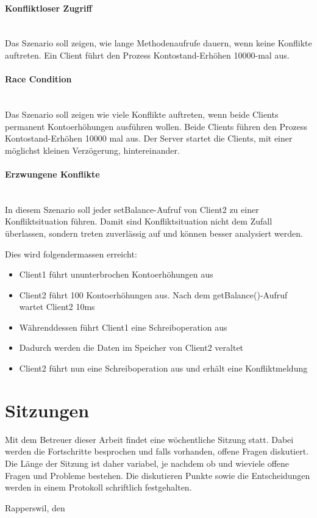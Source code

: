 \documentclass{article}
\begin{document}
\paragraph{Konfliktloser Zugriff}
\label{sec:konfl-zugr}
$~~$ \\
Das Szenario soll zeigen, wie lange Methodenaufrufe dauern, wenn keine Konflikte auftreten. Ein Client führt den Prozess Kontostand-Erhöhen 10000-mal aus.

\paragraph{Race Condition}
\label{sec:race-condition}
$~~$ \\
Das Szenario soll zeigen wie viele Konflikte auftreten, wenn beide Clients permanent Kontoerhöhungen ausführen wollen.
Beide Clients führen den Prozess Kontostand-Erhöhen 10000 mal aus. Der Server startet die Clients, mit einer möglichst kleinen Verzögerung, hintereinander. 

\paragraph{Erzwungene Konflikte}
\label{sec:erzwungene-konflikte}
$~~$ \\
In diesem Szenario soll jeder setBalance-Aufruf von Client2 zu einer Konfliktsituation führen. Damit sind Konfliktsituation nicht dem Zufall überlassen, sondern treten zuverlässig auf und können besser analysiert werden.

\noindent Dies wird folgendermassen erreicht:
\begin{itemize}
\item Client1 führt ununterbrochen Kontoerhöhungen aus
\item Client2 führt 100 Kontoerhöhungen aus. Nach dem getBalance()-Aufruf wartet Client2 10ms
\item Währenddessen führt Client1 eine Schreiboperation aus
\item Dadurch werden die Daten im Speicher von Client2 veraltet
\item Client2 führt nun eine Schreiboperation aus und erhält eine Konfliktmeldung
\end{itemize}

\section{Sitzungen}
Mit dem Betreuer dieser Arbeit findet eine wöchentliche Sitzung statt. Dabei werden die Fortschritte besprochen und falls vorhanden, offene Fragen diskutiert. Die Länge der Sitzung ist daher variabel, je nachdem ob und wieviele offene Fragen und Probleme bestehen. Die diskutieren Punkte sowie die Entscheidungen werden in einem Protokoll schriftlich festgehalten.


\vspace{2cm}

\noindent Rapperswil, den \date{\today} \\
\end{document}

